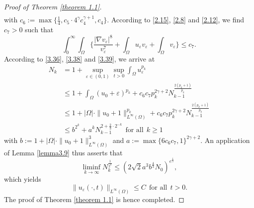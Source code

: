 \documentclass[12pt]{article}
\theoremstyle{plain}
\theoremstyle{definition}
\numberwithin{equation}{section}
\begin{document}
\begin{proof}[Proof of Theorem \ref{theorem 1.1}]
\begin{equation}
\begin{split}
     \end{split}
\end{equation}
with $c_6:=\max\{\frac{1}{4},c_5\cdot4^{\gamma}c_4^{\gamma+1},c_4\}$.
According to \eqref{2.15}, \eqref{2.8} and \eqref{2.12}, we find $c_7>0$ such that
\begin{equation}\label{3.39}
    \int_0^{\infty}\int_\Omega\bigg\{\frac{|\nabla v_\varepsilon|^8}{v_\varepsilon^7}+\int_\Omega u_\varepsilon v_\varepsilon+\int_\Omega v_\varepsilon\bigg\}\leq c_7.
\end{equation}
According to \eqref{3.36},  \eqref{3.38} and \eqref{3.39}, we arrive at
\begin{equation*}
    \begin{split}
        N_k&=1+\sup\limits_{\varepsilon\in(0,1)}\sup\limits_{t>0}\int_\Omega u_\varepsilon^{p_k}\\
    &\leq1+\int_\Omega(u_0+\varepsilon)^{p_k}+c_6c_7p_k^{2\gamma+2} N_{k-1}^{\frac{2(p_k+1)}{p_k}}\\
    &\leq1+|\Omega|\cdot\|u_0+1\|_{L^\infty(\Omega)}^{p_k}+c_6c_7p_k^{2\gamma+2} N_{k-1}^{\frac{2(p_k+1)}{p_k}}\\
    &\leq b^{2^k}+a^k N_{k-1}^{2+\frac2 3\cdot2^{-k}}~~\mbox{for all}~~k\geq1
    \end{split}
\end{equation*}
with $b:=1+|\Omega|\cdot\|u_0+1\|_{L^\infty(\Omega)}^3$ and $a:=\max\{6c_6c_7,1\}^{2\gamma+2}$. An application of Lemma \ref{lemma3.9} thus asserts that
\begin{equation*}
        \liminf\limits_{k\to\infty}N_k^{\frac{1}{2^k}}\leq(2\sqrt{2}a^3b^{\frac4 3}N_0)^{e^{\frac{1}{3}}},
    \end{equation*}
    which yields
    \begin{equation}\label{3.40}
    \|u_\varepsilon(\cdot,t)\|_{L^{\infty}(\Omega)}\leq C~~\mbox{for all}~~ t>0.
    \end{equation} The proof of Theorem \ref{theorem 1.1} is hence completed.
\end{proof}
\end{document}
